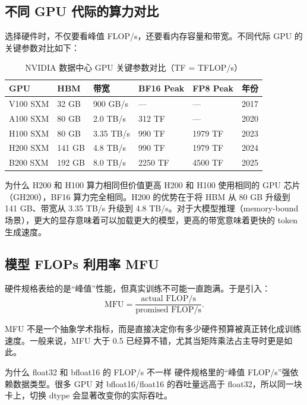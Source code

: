 \subsection{不同 GPU 代际的算力对比}

选择硬件时，不仅要看峰值 FLOP/s，还要看内存容量和带宽。不同代际 GPU 的关键参数对比如下：

\begin{table}[H]
\centering
\begin{tabular}{p{}p{}p{}p{}p{}p{}}
\toprule
\textbf{GPU} & \textbf{HBM} & \textbf{带宽} & \textbf{BF16 Peak} & \textbf{FP8 Peak} & \textbf{年份} \\
\midrule
V100 SXM & 32 GB & 900 GB/s & --- & --- & 2017 \\
A100 SXM & 80 GB & 2.0 TB/s & 312 TF & --- & 2020 \\
H100 SXM & 80 GB & 3.35 TB/s & 990 TF & 1979 TF & 2023 \\
H200 SXM & 141 GB & 4.8 TB/s & 990 TF & 1979 TF & 2024 \\
B200 SXM & 192 GB & 8.0 TB/s & 2250 TF & 4500 TF & 2025 \\
\bottomrule
\end{tabular}
\caption{NVIDIA 数据中心 GPU 关键参数对比（TF = TFLOP/s）}
\end{table}

\begin{knowledgebox}{为什么 H200 和 H100 算力相同但价值更高}
H200 和 H100 使用相同的 GPU 芯片（GH200），BF16 算力完全相同。H200 的优势在于将 HBM 从 80 GB 升级到 141 GB、带宽从 3.35 TB/s 升级到 4.8 TB/s。对于大模型推理（memory-bound 场景），更大的显存意味着可以加载更大的模型，更高的带宽意味着更快的 token 生成速度。
\end{knowledgebox}

\subsection{模型 FLOPs 利用率 MFU}

硬件规格表给的是“峰值”性能，但真实训练不可能一直跑满。于是引入：
\[
\text{MFU} = \frac{\text{actual FLOP/s}}{\text{promised FLOP/s}}.
\]

MFU 不是一个抽象学术指标，而是直接决定你有多少硬件预算被真正转化成训练速度。一般来说，MFU 大于 0.5 已经算不错，尤其当矩阵乘法占主导时更是如此。

\begin{warningbox}{为什么 float32 和 bfloat16 的 FLOP/s 不一样}
硬件规格里的“峰值 FLOP/s”强依赖数据类型。很多 GPU 对 bfloat16/float16 的吞吐量远高于 float32，所以同一块卡上，切换 dtype 会显著改变你的实际吞吐。
\end{warningbox}

